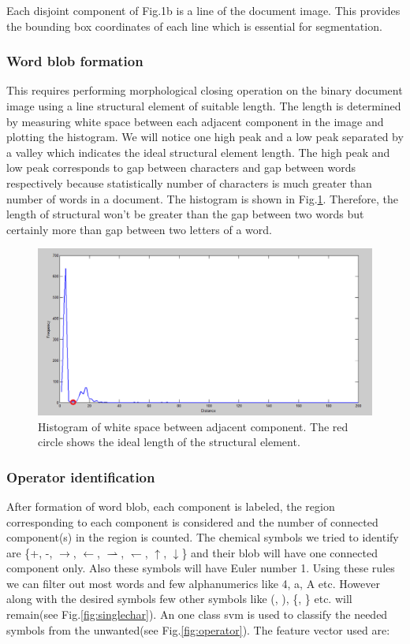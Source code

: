 \documentclass[conference]{IEEEtran}
\begin{document}
Each disjoint component of Fig.1b is a line of the document image. This provides the bounding box coordinates of each line which is essential for segmentation.

\subsubsection{Word blob formation}

This requires performing morphological closing operation on the binary document image using a line structural element of suitable length. The length is determined by measuring white space between each adjacent component in the image and plotting the histogram. We will notice one high peak and a low peak separated by a valley which indicates the ideal structural element length. The high peak and low peak corresponds to gap between characters and gap between words respectively because statistically number of characters is much greater than number of words in a document. The histogram is shown in Fig.\ref{fig:histogram}. Therefore, the length of structural won't be greater than the gap between two words but certainly more than gap between two letters of a word.   
     
\begin{figure}[h]
\centering
\includegraphics[width=0.9\linewidth]{histogram}
\caption{Histogram of white space between adjacent component. The red circle shows the ideal length of the structural element.}
\label{fig:histogram}
\end{figure} 

\subsubsection{Operator identification}

After formation of word blob, each component is labeled, the region corresponding to each component is considered and the number of connected component(s) in the region is counted. The chemical symbols we tried to identify are \{+, -, $\rightarrow$, $\leftarrow$, $\rightharpoonup$, $\leftharpoondown$, $\uparrow$, $\downarrow$\} and their blob will have one connected component only. Also these symbols will have Euler number 1. Using these rules we can filter out most words and few alphanumerics like 4, a, A etc. However along with the desired symbols few other symbols like (, ), \{, \} etc. will remain(see Fig.\ref{fig:singlechar}). An one class svm is used to classify the needed symbols from the unwanted(see Fig.\ref{fig:operator}). The feature vector used are:
\end{document}
